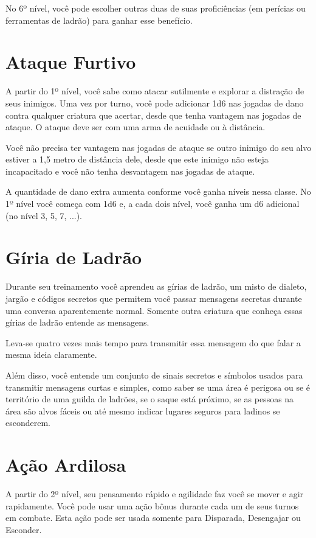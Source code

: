 \documentclass{RPG_Adventure}[2021/10/20]
\begin{document}
\begin{multicols}{2}
No 6º nível, você pode escolher outras duas de suas proficiências (em perícias
ou ferramentas de ladrão) para ganhar esse benefício.

\section*{Ataque Furtivo}%

A partir do 1º nível, você sabe como atacar sutilmente e explorar a distração de
seus inimigos. Uma vez por turno, você pode adicionar 1d6 nas jogadas de dano
contra qualquer criatura que acertar, desde que tenha vantagem nas jogadas de
ataque. O ataque deve ser com uma arma de acuidade ou à distância.

Você não precisa ter vantagem nas jogadas de ataque se outro inimigo do seu alvo
estiver a 1,5 metro de distância dele, desde que este inimigo não esteja
incapacitado e você não tenha desvantagem nas jogadas de ataque.

A quantidade de dano extra aumenta conforme você ganha níveis nessa classe. No
1º nível você começa com 1d6 e, a cada dois nível, você ganha um d6 adicional
(no nível 3, 5, 7, ...).

\section*{Gíria de Ladrão}%

Durante seu treinamento você aprendeu as gírias de ladrão, um misto de dialeto,
jargão e códigos secretos que permitem você passar mensagens secretas durante
uma conversa aparentemente normal. Somente outra criatura que conheça essas
gírias de ladrão entende as mensagens.

Leva-se quatro vezes mais tempo para transmitir essa mensagem do que falar a
mesma ideia claramente.

Além disso, você entende um conjunto de sinais secretos e símbolos usados para
transmitir mensagens curtas e simples, como saber se uma área é perigosa ou se é
território de uma guilda de ladrões, se o saque está próximo, se as pessoas na
área são alvos fáceis ou até mesmo indicar lugares seguros para ladinos se
esconderem.

\section*{Ação Ardilosa}%

A partir do 2º nível, seu pensamento rápido e agilidade faz você se mover e agir
rapidamente. Você pode usar uma ação bônus durante cada um de seus turnos em
combate. Esta ação pode ser usada somente para Disparada, Desengajar ou
Esconder.


\end{multicols}
\end{document}
